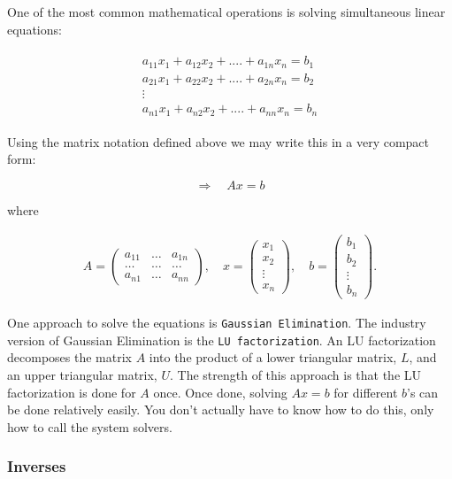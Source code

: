 One of the most common mathematical operations is solving simultaneous
linear equations:

\[\begin{aligned}
\begin{array}{c} a_{11}x_1 + a_{12}x_2 + .... + a_{1n}x_n = b_1 \\ a_{21}x_1 + a_{22}x_2 + .... + a_{2n}x_n = b_2 \\ \vdots
\\ a_{n1}x_1 + a_{n2}x_2 + .... + a_{nn}x_n = b_n \end{array}
\end{aligned}\]

Using the matrix notation defined above we may write this in a very
compact form:

\[\Rightarrow\quad  Ax = b\]

where

\[\begin{aligned}
A = \left( \begin{array}{ccc}a_{11}&\dots&a_{1n}\\ \dots & \dots & \dots
\\ a_{n1} & \dots & a_{nn}\end{array}\right), \quad x = \left(\begin{array}{c} x_1 \\ x_2 \\ \vdots
\\ x_n \end{array}\right) , \quad
b =  \left(\begin{array}{c} b_1 \\ b_2 \\ \vdots
\\ b_n \end{array}\right) .
\end{aligned}\]

One approach to solve the equations is \texttt{Gaussian\ Elimination}.
The industry version of Gaussian Elimination is the
\texttt{LU\ factorization}. An LU factorization decomposes the matrix
\(A\) into the product of a lower triangular matrix, \(L\), and an upper
triangular matrix, \(U\). The strength of this approach is that the LU
factorization is done for \(A\) once. Once done, solving \(Ax = b\) for
different \(b\)'s can be done relatively easily. You don't actually have
to know how to do this, only how to call the system solvers.

\hypertarget{inverses}{%
\subsubsection{Inverses}\label{inverses}}

